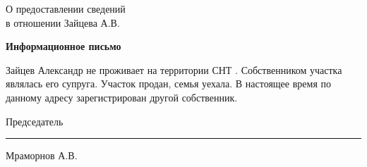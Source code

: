 \begin{flushleft}
О предоставлении сведений\\
в отношении Зайцева  А.В.
\end{flushleft}
\vspace{10mm}
\begin{center}
	\Large\textbf{Информационное письмо}
\end{center}
\par

Зайцев Александр не проживает на территории СНТ . Собственником участка являлась его супруга. Участок продан, семья уехала. В настоящее время по данному адресу зарегистрирован другой собственник. 

\vspace{35mm}
Председатель \hfill    \rule{4cm}{0.1 mm}    Мраморнов А.В.





